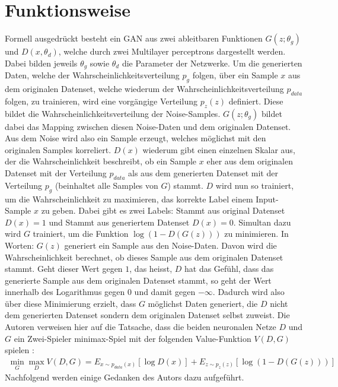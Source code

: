 \section{Funktionsweise}
Formell ausgedrückt besteht ein \Gls{GAN} aus zwei ableitbaren Funktionen $G(z;\theta_g)$ und $D(x,\theta_d)$, welche durch zwei \Glspl{Multilayer perceptron}
dargestellt werden. Dabei bilden jeweils $\theta_g$ sowie $\theta_d$ die Parameter der Netzwerke. Um die generierten Daten, welche der Wahrscheinlichkeitsverteilung $p_g$ folgen, über ein Sample $x$ aus
dem originalen Datenset, welche wiederum der Wahrscheinlichkeitsverteilung $p_{data}$ folgen, zu trainieren, wird eine vorgängige Verteilung $p_z(z)$ definiert. Diese bildet die
Wahrscheinlichkeitsverteilung der Noise-Samples. $G(z;\theta_g)$ bildet dabei das
Mapping zwischen diesen Noise-Daten und dem originalen Datenset.
Aus dem Noise wird also ein Sample erzeugt, welches möglichst mit den originalen Samples korreliert.
$D(x)$ wiederum gibt einen einzelnen Skalar aus, der die Wahrscheinlichkeit beschreibt, ob ein Sample $x$ eher aus dem originalen Datenset mit der Verteilung $p_{data}$
als aus dem generierten Datenset mit der Verteilung $p_g$ (beinhaltet alle Samples von $G$) stammt.
$D$ wird nun so trainiert, um die Wahrscheinlichkeit zu maximieren, das korrekte Label einem Input-Sample $x$ zu geben. Dabei gibt es zwei Labels:
\glqq Stammt aus original Datenset $D(x) = 1$\grqq{} und \glqq Stammt aus generiertem Datenset $D(x) = 0$\grqq{}. Simultan dazu wird $G$ trainiert, um die Funktion
$\log(1 - D(G(z)))$ zu minimieren\cite[p.~1]{8253599}. In Worten: $G(z)$ generiert ein Sample aus den Noise-Daten.
Davon wird die Wahrscheinlichkeit berechnet, ob dieses Sample aus dem originalen Datenset stammt. Geht dieser Wert gegen $1$, das heisst,
$D$ hat das Gefühl, dass das generierte Sample aus dem originalen Datenset stammt, so geht der Wert innerhalb des Logarithmus gegen 0 und damit gegen $-\infty$.
Dadurch wird also über diese Minimierung erzielt, dass $G$ möglichst Daten generiert, die $D$ nicht dem generierten Datenset sondern dem originalen Datenset selbst zuweist.
Die Autoren verweisen hier auf die Tatsache, dass die beiden neuronalen Netze $D$ und $G$ ein
Zwei-Spieler minimax-Spiel mit der folgenden Value-Funktion $V(D,G)$ spielen \cite[p.~2]{8253599}:
\begin{align}
    \min_{G} \max_{D} V(D, G) = E_{x\sim p_{data}(x)}[\log D(x)] + E_{z\sim p_z(z)}[\log(1 - D(G(z)))] \label{eq:1}
\end{align}
Nachfolgend werden einige Gedanken des Autors dazu aufgeführt.\\
